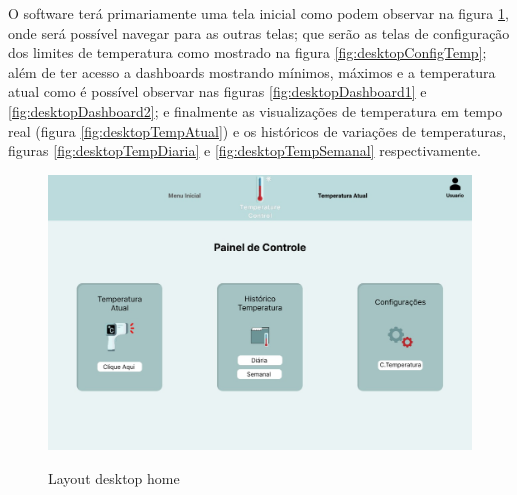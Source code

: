 %
%
%

    O software terá primariamente uma tela inicial 
    como podem observar na figura \ref{fig:desktopHome}, 
    onde será possível navegar para as outras telas;
    que serão as telas de configuração dos limites
    de temperatura como mostrado na 
    figura \ref{fig:desktopConfigTemp};
    além de ter acesso a dashboards mostrando 
    mínimos, máximos e a temperatura atual 
    como é possível observar nas figuras 
    \ref{fig:desktopDashboard1} e \ref{fig:desktopDashboard2};
    e finalmente as visualizações de temperatura em 
    tempo real (figura \ref{fig:desktopTempAtual})
    e os históricos de variações de temperaturas,
    figuras \ref{fig:desktopTempDiaria} e \ref{fig:desktopTempSemanal}
    respectivamente.


    \begin{figure}[ht]
        \caption{Layout desktop home}
        \centering
        \includegraphics[scale=0.35]{img/desktop/home.jpeg}
        \label{fig:desktopHome}
    \end{figure}

